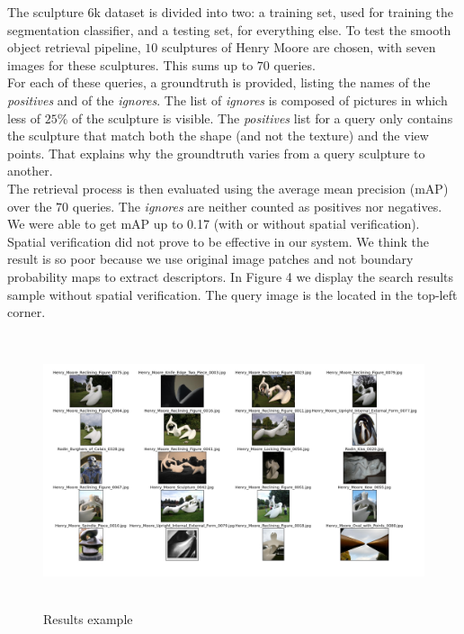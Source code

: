 \documentclass{article}
\begin{document}
The sculpture 6k dataset is divided into two: a training set, used for
training the segmentation classifier, and a testing set, for everything else.
To test the smooth object retrieval pipeline, $10$ sculptures of Henry Moore are
chosen, with seven images for these sculptures. This sums up to $70$ queries. \\
For each of these queries, a groundtruth is provided, listing the names of the
\textit{positives} and of the \textit{ignores}. The list of \textit{ignores} is
composed of pictures in which less of $25$\% of the sculpture is visible. The
\textit{positives} list for a query only contains the sculpture that match
both the shape (and not the texture) and the view points. That explains why
the groundtruth varies from a query sculpture to another. \\
The retrieval process is then evaluated using the average mean precision (mAP)
over the $70$ queries. The \textit{ignores} are neither counted as positives nor
negatives. We were able to get mAP up to 0.17 (with or without spatial
verification). Spatial verification did not prove to be effective in
our system. We think the result is so poor because we use original
image patches and not boundary probability maps to extract
descriptors. In Figure 4 we display the search results sample without spatial verification. The query image is the located in the top-left corner. \\

\begin{figure}


\caption{Results example}

\begin{center}
\includegraphics[height=8cm, width=12cm]{images/results.jpg}
\end{center}

\end{figure}
\end{document}
